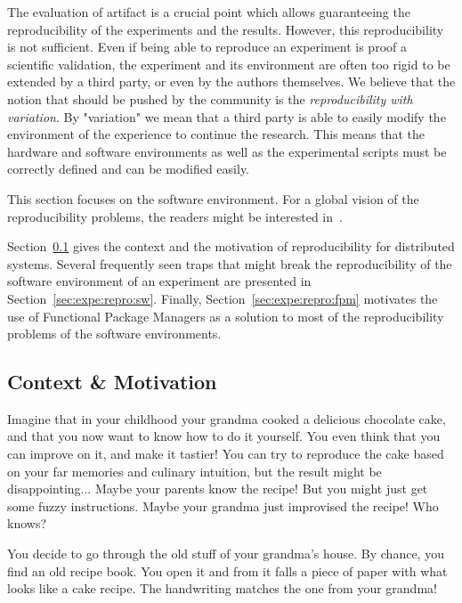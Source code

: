 \documentclass[sigconf]{acmart}
\begin{document}
The evaluation of artifact is a crucial point which allows guaranteeing the reproducibility of the experiments and the results.
However, this reproducibility is not sufficient.
Even if being able to reproduce an experiment is proof a scientific validation, the experiment and its environment are often too rigid to be extended by a third party, or even by the authors themselves. 
We believe that the notion that should be pushed by the community is the \emph{reproducibility with variation}.
By "variation" we mean that a third party is able to easily modify the environment of the experience to continue the research.
This means that the hardware and software environments as well as the experimental scripts must be correctly defined and can be modified easily.

This section focuses on the software environment.
For a global vision of the reproducibility problems, the readers might be interested in\ \cite{ivie2018reproducibility}.



Section\ \ref{sec:expe:repro:motiv} gives the context and the motivation of reproducibility for distributed systems.
Several frequently seen traps that might break the reproducibility of the software environment of an experiment are presented in Section\ \ref{sec:expe:repro:sw}.
Finally, Section\ \ref{sec:expe:repro:fpm} motivates the use of Functional Package Managers as a solution to most of the reproducibility problems of the software environments. 

\subsection{Context \& Motivation}\label{sec:expe:repro:motiv}

Imagine that in your childhood your grandma cooked a delicious chocolate cake, and that you now want to know how to do it yourself.
You even think that you can improve on it, and make it tastier!
You can try to reproduce the cake based on your far memories and culinary intuition, but the result might be disappointing...
Maybe your parents know the recipe!
But you might just get some fuzzy instructions.
Maybe your grandma just improvised the recipe!
Who knows?

You decide to go through the old stuff of your grandma's house.
By chance, you find an old recipe book.
You open it and from it falls a piece of paper with what looks like a cake recipe.
The handwriting matches the one from your grandma!
\end{document}
